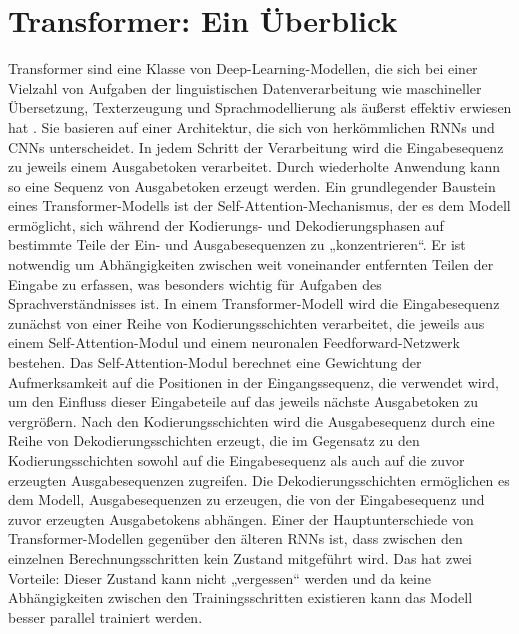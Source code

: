 \section{Transformer: Ein Überblick}
\label{subsec:Foundations:Transformer}
Transformer \cite{transformers} sind eine Klasse von Deep-Learning-Modellen, die sich bei einer Vielzahl von Aufgaben der linguistischen Datenverarbeitung wie maschineller Übersetzung, Text\-er\-zeugung und Sprachmodellierung als äußerst effektiv erwiesen hat \cite{transformers,bert,FewShotLearners,gpt4}.
Sie basieren auf einer Architektur, die sich von herkömmlichen RNNs und CNNs unterscheidet.
In jedem Schritt der Verarbeitung wird die Eingabesequenz zu jeweils einem Ausgabetoken verarbeitet.
Durch wiederholte Anwendung kann so eine Sequenz von Ausgabetoken erzeugt werden.
Ein grundlegender Baustein eines Transformer-Modells ist der Self-Attention-Mechanismus, der es dem Modell ermöglicht, sich während der Kodierungs- und Dekodierungsphasen auf bestimmte Teile der Ein- und Ausgabesequenzen zu „konzentrieren“.
Er ist notwendig um Abhängigkeiten zwischen weit voneinander entfernten Teilen der Eingabe zu erfassen, was besonders wichtig für Aufgaben des Sprachverständnisses ist.
In einem Transformer-Modell wird die Eingabesequenz zunächst von einer Reihe von Kodierungsschichten verarbeitet, die jeweils aus einem Self-Attention-Modul und einem neuronalen Feedforward-Netzwerk bestehen.
Das Self-Attention-Modul berechnet eine Gewichtung der Aufmerksamkeit auf die Positionen in der Eingangssequenz, die verwendet wird, um den Einfluss dieser Eingabeteile auf das jeweils nächste Ausgabetoken zu vergrößern.
Nach den Kodierungsschichten wird die Ausgabesequenz durch eine Reihe von Dekodierungsschichten erzeugt, die im Gegensatz zu den Kodierungsschichten sowohl auf die Eingabesequenz als auch auf die zuvor erzeugten Ausgabesequenzen zugreifen.
Die Dekodierungsschichten ermöglichen es dem Modell, Ausgabesequenzen zu erzeugen, die von der Eingabesequenz und zuvor erzeugten Ausgabetokens abhängen.
Einer der Hauptunterschiede von Transformer-Modellen gegenüber den älteren RNNs ist, dass zwischen den einzelnen Berechnungsschritten kein Zustand mitgeführt wird.
Das hat zwei Vorteile: Dieser Zustand kann nicht „vergessen“ werden und da keine Abhängigkeiten zwischen den Trainingsschritten existieren kann das Modell besser parallel trainiert werden.

